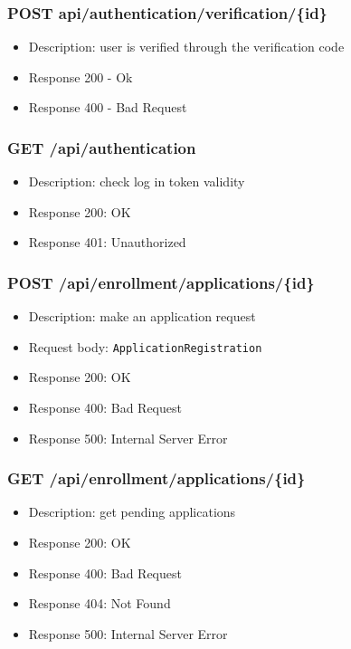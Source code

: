 \subsubsection{POST api/authentication/verification/\{id\}}
\begin{itemize}
    \item Description: user is verified through the verification code
    \item Response 200 - Ok
    \item Response 400 - Bad Request
\end{itemize}

\subsubsection{GET /api/authentication}
\begin{itemize}
    \item Description: check log in token validity
    \item Response 200: OK
    \item Response 401: Unauthorized
\end{itemize}

\subsubsection{POST /api/enrollment/applications/\{id\}}
\begin{itemize}
    \item Description: make an application request
    \item Request body: \verb|ApplicationRegistration|
    \item Response 200: OK
    \item Response 400: Bad Request
    \item Response 500: Internal Server Error
\end{itemize}

\subsubsection{GET /api/enrollment/applications/\{id\}}
\begin{itemize}
    \item Description: get pending applications
    \item Response 200: OK
    \item Response 400: Bad Request
    \item Response 404: Not Found
    \item Response 500: Internal Server Error
\end{itemize}

